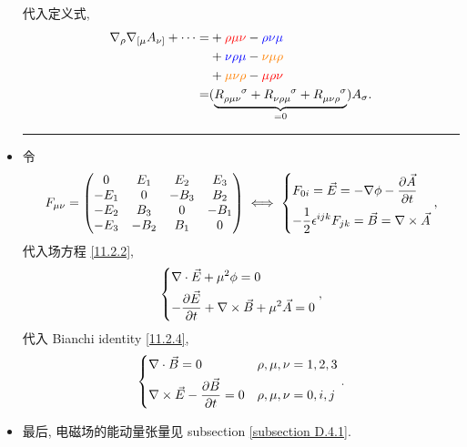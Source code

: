 \begin{itemize}
	\begin{tcolorbox}[title=calculation:]
		代入定义式,
		\begin{align}
			\nabla_\rho \nabla_{[\mu} A_{\nu]} + \cdots =& + \mathcolor{red}{\rho \mu \nu} - \mathcolor{blue}{\rho \nu \mu} \notag \\
			& + \mathcolor{blue}{\nu \rho \mu} - \mathcolor{orange}{\nu \mu \rho} \notag \\
			& + \mathcolor{orange}{\mu \nu \rho} - \mathcolor{red}{\mu \rho \nu} \notag \\
			=& (\underbrace{\tensor{R}{_{\rho \mu \nu}^\sigma} + \tensor{R}{_{\nu \rho \mu}^\sigma} + \tensor{R}{_{\mu \nu \rho}^\sigma}}_{= 0}) A_\sigma.
		\end{align}
	\end{tcolorbox}
	
	\noindent\rule[0.5ex]{\linewidth}{0.5pt} %
	
	\item 令
	\begin{equation}
		F_{\mu \nu} = \begin{pmatrix}
			0 & E_1 & E_2 & E_3 \\
			- E_1 & 0 & - B_3 & B_2 \\
			- E_2 & B_3 & 0 & - B_1 \\
			- E_3 & - B_2 & B_1 & 0
		\end{pmatrix} \iff \begin{dcases}
			F_{0 i} = \vec{E} = - \nabla \phi - \frac{\partial \vec{A}}{\partial t} \\
			- \frac{1}{2} \epsilon^{i j k} F_{j k} = \vec{B} = \nabla \times \vec{A}
		\end{dcases},
	\end{equation}
	代入场方程 \eqref{11.2.2},
	\begin{equation}
		\begin{dcases}
			\nabla \cdot \vec{E} + \mu^2 \phi = 0 \\
			- \frac{\partial \vec{E}}{\partial t} + \nabla \times \vec{B} + \mu^2 \vec{A} = 0
		\end{dcases},
	\end{equation}
	代入 Bianchi identity \eqref{11.2.4},
	\begin{equation}
		\begin{dcases}
			\nabla \cdot \vec{B} = 0 & \rho, \mu, \nu = 1, 2, 3 \\
			\nabla \times \vec{E} - \frac{\partial \vec{B}}{\partial t} = 0 & \rho, \mu, \nu = 0, i, j
		\end{dcases}.
	\end{equation}
	
	\item 最后, 电磁场的能动量张量见 subsection \ref{subsection D.4.1}.
\end{itemize}

